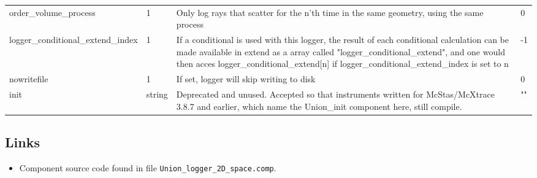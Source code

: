 \begin{longtable}{p{}p{}p{}p{}}
order\_volume\_process & 1 & Only log rays that scatter for the n'th time in the same geometry, using the same process & 0 \\
logger\_conditional\_extend\_index & 1 & If a conditional is used with this logger, the result of each conditional calculation can be made available in extend as a array called "logger\_conditional\_extend", and one would then acces logger\_conditional\_extend[n] if logger\_conditional\_extend\_index is set to n & -1 \\
nowritefile & 1 & If set, logger will skip writing to disk & 0 \\
init & string & Deprecated and unused. Accepted so that instruments written for McStas/McXtrace 3.8.7 and earlier, which name the Union\_init component here, still compile. & "" \\
\bottomrule
\end{longtable}

\subsection*{Links}
\begin{itemize}
  \item Component source code found in file \texttt{Union\_logger\_2D\_space.comp}.
\end{itemize}
